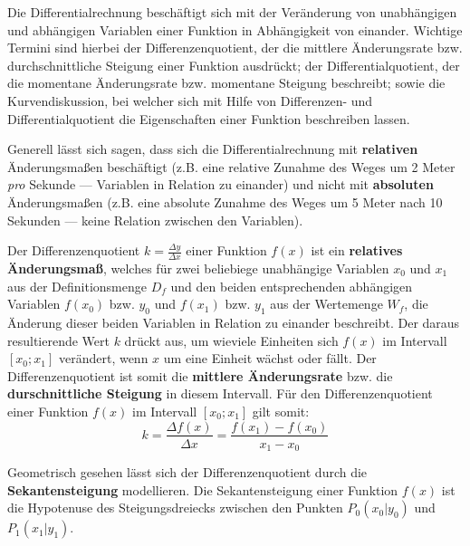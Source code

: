 



\thispagestyle{plain}



Die Differentialrechnung besch\"{a}ftigt sich mit der Ver\"{a}nderung von unabh\"{a}ngigen und abh\"{a}ngigen Variablen einer Funktion in Abh\"{a}ngigkeit von einander. Wichtige Termini sind hierbei der Differenzenquotient, der die mittlere \"{A}nderungsrate bzw. durchschnittliche Steigung einer Funktion ausdr\"{u}ckt; der Differentialquotient, der die momentane \"{A}nderungsrate bzw. momentane Steigung beschreibt; sowie die Kurvendiskussion, bei welcher sich mit Hilfe von Differenzen- und Differentialquotient die Eigenschaften einer Funktion beschreiben lassen. 

Generell l\"{a}sst sich sagen, dass sich die Differentialrechnung mit \textbf{relativen} \"{A}nderungsma\ss{}en besch\"{a}ftigt (z.B. eine relative Zunahme des Weges um 2 Meter \emph{pro} Sekunde --- Variablen in Relation zu einander) und nicht mit \textbf{absoluten} \"{A}nderungsma\ss{}en (z.B. eine absolute Zunahme des Weges um 5 Meter nach 10 Sekunden --- keine Relation zwischen den Variablen).


Der Differenzenquotient $k = \frac{\Delta y}{\Delta x}$ einer Funktion $f(x)$ ist ein \textbf{relatives \"{A}nderungsma\ss{}}, welches f\"{u}r zwei beliebiege unabh\"{a}ngige Variablen $x_{0}$ und $x_{1}$ aus der Definitionsmenge $D_{f}$ und den beiden entsprechenden abh\"{a}ngigen Variablen $f(x_{0})$ bzw. $y_{0}$ und $f(x_{1})$ bzw. $y_{1}$ aus der Wertemenge $W_{f}$, die \"{A}nderung dieser beiden Variablen in Relation zu einander beschreibt. Der daraus resultierende Wert $k$ dr\"{u}ckt aus, um wieviele Einheiten sich $f(x)$ im Intervall $[x_{0} ; x_{1}]$ ver\"{a}ndert, wenn $x$ um eine Einheit w\"{a}chst oder f\"{a}llt. Der Differenzenquotient ist somit die \textbf{mittlere \"{A}nderungsrate} bzw. die \textbf{durschnittliche Steigung} in diesem Intervall. F\"{u}r den Differenzenquotient einer Funktion $f(x)$ im Intervall $[x_{0} ; x_{1}]$ gilt somit: $$k = \frac{\Delta f(x)}{\Delta x} = \frac{f(x_{1}) - f(x_{0})}{x_{1} - x_{0}}$$

Geometrisch gesehen l\"{a}sst sich der Differenzenquotient durch die \textbf{Sekantensteigung} modellieren. Die Sekantensteigung einer Funktion $f(x)$ ist die Hypotenuse des Steigungsdreiecks zwischen den Punkten $P_{0}(x_{0}|y_{0})$ und $P_{1}(x_{1}|y_{1})$.

